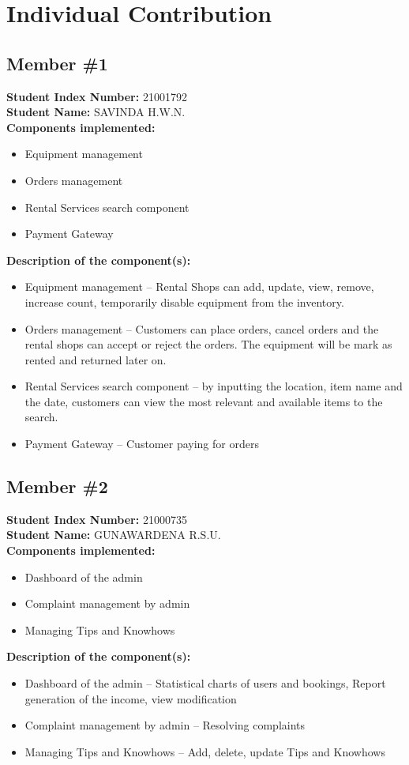 \section{Individual Contribution}

\subsection{Member \#1}
\textbf{Student Index Number: } 21001792\\
\textbf{Student Name: } SAVINDA H.W.N.\\
\textbf{Components implemented:} 
\begin{itemize}
    \item Equipment management
    \item Orders management
    \item Rental Services search component
    \item Payment Gateway
\end{itemize}
\textbf{Description of the component(s):}
\begin{itemize}
    \item Equipment management – Rental Shops can add, update, view, remove, increase count, temporarily disable equipment from the inventory.
    \item Orders management – Customers can place orders, cancel orders and the rental shops can accept or reject the orders. The equipment will be mark as rented and returned later on.
    \item Rental Services search component – by inputting the location, item name and the date, customers can view the most relevant and available items to the search.
    \item Payment Gateway – Customer paying for orders
\end{itemize}






\subsection{Member \#2}
\textbf{Student Index Number: } 21000735 \\
\textbf{Student Name: } GUNAWARDENA R.S.U. \\
\textbf{Components implemented:} 
\begin{itemize}
    \item Dashboard of the admin
    \item Complaint management by admin
    \item Managing Tips and Knowhows 
\end{itemize}
\textbf{Description of the component(s):}
\begin{itemize}
    \item Dashboard of the admin – Statistical charts of users and bookings, Report generation of the income, view modification
    \item Complaint management by admin – Resolving complaints 
    \item Managing Tips and Knowhows – Add, delete, update Tips and Knowhows
\end{itemize}



